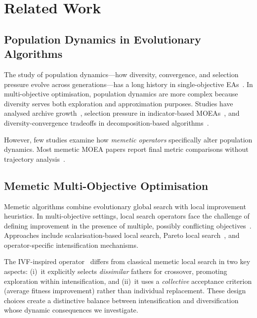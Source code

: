 \documentclass[runningheads]{llncs}
\begin{document}
\section{Related Work}
\label{sec:related}

\subsection{Population Dynamics in Evolutionary Algorithms}

The study of population dynamics---how diversity, convergence, and
selection pressure evolve across generations---has a long history in
single-objective EAs~\cite{eiben2003introduction}. In multi-objective
optimisation, population dynamics are more complex because diversity
serves both exploration and approximation purposes. Studies have
analysed archive growth~\cite{knowles2003properties}, selection pressure
in indicator-based MOEAs~\cite{li2014selection}, and
diversity-convergence tradeoffs in decomposition-based
algorithms~\cite{trivedi2017survey}.

However, few studies examine how \emph{memetic operators} specifically
alter population dynamics. Most memetic MOEA papers report final metric
comparisons without trajectory analysis~\cite{ishibuchi2015review}.

\subsection{Memetic Multi-Objective Optimisation}

Memetic algorithms combine evolutionary global search with local
improvement heuristics. In multi-objective settings, local search
operators face the challenge of defining improvement in the presence of
multiple, possibly conflicting objectives~\cite{knowles2005memetic}.
Approaches include scalarisation-based local search, Pareto local
search~\cite{paquete2004stochastic}, and operator-specific
intensification mechanisms.

The IVF-inspired operator~\cite{sanches2026ivfspea2} differs from
classical memetic local search in two key aspects: (i)~it explicitly
selects \emph{dissimilar} fathers for crossover, promoting exploration
within intensification, and (ii)~it uses a \emph{collective} acceptance
criterion (average fitness improvement) rather than individual
replacement. These design choices create a distinctive balance between
intensification and diversification whose dynamic consequences we
investigate.
\end{document}
